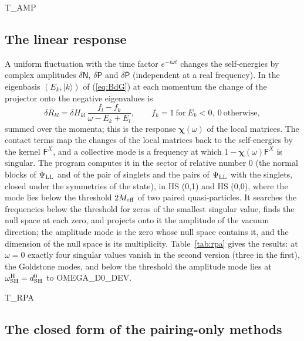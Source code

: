 \documentclass[aps,prd,onecolumn,superscriptaddress,nofootinbib,floatfix,longbibliography]{revtex4-2}
\newcommand{\LL}{{\rm LL}}
\newcommand{\SH}{{\rm SH}}
\begin{document}
{{T_AMP}}

\subsection{The linear response}

A uniform fluctuation with the time factor $e^{-i\omega t}$ changes the self-energies by complex amplitudes $\delta\mathsf N$,
$\delta\mathsf P$ and $\delta\bar{\mathsf P}$ (independent at a real frequency). In the eigenbasis $(E_k,|k\rangle)$ of
(\ref{eq:BdG}) at each momentum the change of the projector onto the negative eigenvalues is
\begin{equation}
\delta R_{kl}=\delta H_{kl}\,\frac{f_l-f_k}{\omega-E_k+E_l},\qquad f_k=1\ \text{for}\ E_k<0,\ 0\ \text{otherwise},
\label{eq:dR}
\end{equation}
summed over the momenta; this is the response $\bm\chi(\omega)$ of the local matrices. The contact terms map the changes of
the local matrices back to the self-energies by the kernel $\mathsf F^X$, and a collective mode is a frequency at which
$1-\bm\chi(\omega)\mathsf F^X$ is singular. The program computes it in the sector of relative number 0 (the normal blocks of
$\Psi_\LL$ and of the pair of singlets and the pairs of $\Psi_\LL$ with the singlets, closed under the symmetries of the
state), in HS (0,1) and HS (0,0), where the mode lies below the threshold $2M_{\rm eff}$ of two paired quasi-particles. It
searches the frequencies below the threshold for zeros of the smallest singular value, finds the null space at each zero,
and projects onto it the amplitude of the vacuum direction; the amplitude mode is the zero whose null space contains it,
and the dimension of the null space is its multiplicity. Table~\ref{tab:rpa} gives the results: at $\omega=0$ exactly
four singular values vanish in the second version (three in the first), the Goldstone modes, and below the threshold the
amplitude mode lies at $\omega^{\rm H}_\SH=d^0_\SH$ to {{OMEGA_D0_DEV}}.

{{T_RPA}}

\subsection{The closed form of the pairing-only methods}
\end{document}
